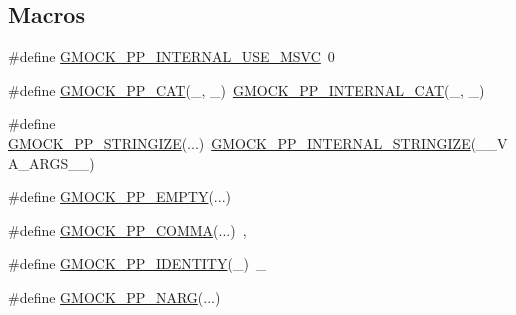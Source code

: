 \subsection*{Macros}
\begin{DoxyCompactItemize}
\item 
\#define \mbox{\hyperlink{_obj__test_2lib_2googletest-master_2googlemock_2include_2gmock_2internal_2gmock-pp_8h_a6d4eb33dd19ac1997d7585961e8cc576}{G\+M\+O\+C\+K\+\_\+\+P\+P\+\_\+\+I\+N\+T\+E\+R\+N\+A\+L\+\_\+\+U\+S\+E\+\_\+\+M\+S\+VC}}~0
\item 
\#define \mbox{\hyperlink{_obj__test_2lib_2googletest-master_2googlemock_2include_2gmock_2internal_2gmock-pp_8h_a108c52ffa81ab99348d23b8fa76fded3}{G\+M\+O\+C\+K\+\_\+\+P\+P\+\_\+\+C\+AT}}(\+\_,  \+\_)~\mbox{\hyperlink{_obj__test_2lib_2googletest-master_2googlemock_2include_2gmock_2internal_2gmock-pp_8h_a2b034c776c832e3d951f5d123658a7ba}{G\+M\+O\+C\+K\+\_\+\+P\+P\+\_\+\+I\+N\+T\+E\+R\+N\+A\+L\+\_\+\+C\+AT}}(\+\_, \+\_)
\item 
\#define \mbox{\hyperlink{_obj__test_2lib_2googletest-master_2googlemock_2include_2gmock_2internal_2gmock-pp_8h_a5e7b60e34a7bb66bac56c440f6aa52cb}{G\+M\+O\+C\+K\+\_\+\+P\+P\+\_\+\+S\+T\+R\+I\+N\+G\+I\+ZE}}(...)~\mbox{\hyperlink{_obj__test_2lib_2googletest-master_2googlemock_2include_2gmock_2internal_2gmock-pp_8h_afd092b75707cbc1efd7fe183c94afb79}{G\+M\+O\+C\+K\+\_\+\+P\+P\+\_\+\+I\+N\+T\+E\+R\+N\+A\+L\+\_\+\+S\+T\+R\+I\+N\+G\+I\+ZE}}(\+\_\+\+\_\+\+V\+A\+\_\+\+A\+R\+G\+S\+\_\+\+\_\+)
\item 
\#define \mbox{\hyperlink{_obj__test_2lib_2googletest-master_2googlemock_2include_2gmock_2internal_2gmock-pp_8h_a7dc39000427944f011a62b2aa915fc2a}{G\+M\+O\+C\+K\+\_\+\+P\+P\+\_\+\+E\+M\+P\+TY}}(...)
\item 
\#define \mbox{\hyperlink{_obj__test_2lib_2googletest-master_2googlemock_2include_2gmock_2internal_2gmock-pp_8h_a44870968c9989ec20c90812361e21a55}{G\+M\+O\+C\+K\+\_\+\+P\+P\+\_\+\+C\+O\+M\+MA}}(...)~,
\item 
\#define \mbox{\hyperlink{_obj__test_2lib_2googletest-master_2googlemock_2include_2gmock_2internal_2gmock-pp_8h_a6123441ddc433915bfc8996a0a4eb397}{G\+M\+O\+C\+K\+\_\+\+P\+P\+\_\+\+I\+D\+E\+N\+T\+I\+TY}}(\+\_)~\+\_
\item 
\#define \mbox{\hyperlink{_obj__test_2lib_2googletest-master_2googlemock_2include_2gmock_2internal_2gmock-pp_8h_a9db18220b88597a07704bc7cf3b13304}{G\+M\+O\+C\+K\+\_\+\+P\+P\+\_\+\+N\+A\+RG}}(...)
\item 

\end{DoxyCompactItemize}
